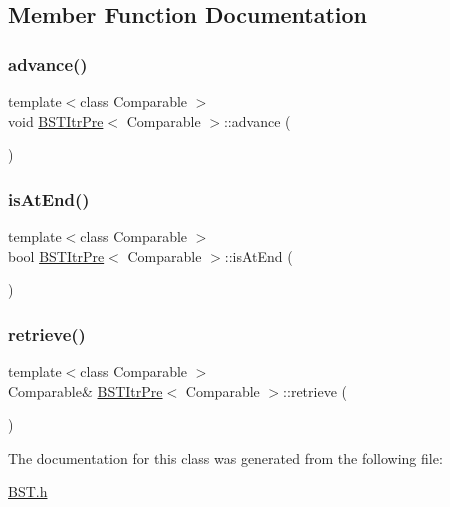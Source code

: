 \subsection{Member Function Documentation}
\mbox{\label{class_b_s_t_itr_pre_a7a743d66a842018fd833fb2b0737254d}} 
\subsubsection{\texorpdfstring{advance()}{advance()}}
{\footnotesize\ttfamily template$<$class Comparable $>$ \\
void \hyperlink{class_b_s_t_itr_pre}{B\+S\+T\+Itr\+Pre}$<$ Comparable $>$\+::advance (\begin{DoxyParamCaption}{ }\end{DoxyParamCaption})}

\mbox{\label{class_b_s_t_itr_pre_ae282a7b9ffa9d250bb0f6a6d79f6e8d0}} 
\subsubsection{\texorpdfstring{is\+At\+End()}{isAtEnd()}}
{\footnotesize\ttfamily template$<$class Comparable $>$ \\
bool \hyperlink{class_b_s_t_itr_pre}{B\+S\+T\+Itr\+Pre}$<$ Comparable $>$\+::is\+At\+End (\begin{DoxyParamCaption}{ }\end{DoxyParamCaption})\hspace{0.3cm}{\ttfamily [inline]}}

\mbox{\label{class_b_s_t_itr_pre_af40033e97f63bf025c2e33a9fdce4c43}} 
\subsubsection{\texorpdfstring{retrieve()}{retrieve()}}
{\footnotesize\ttfamily template$<$class Comparable $>$ \\
Comparable\& \hyperlink{class_b_s_t_itr_pre}{B\+S\+T\+Itr\+Pre}$<$ Comparable $>$\+::retrieve (\begin{DoxyParamCaption}{ }\end{DoxyParamCaption})\hspace{0.3cm}{\ttfamily [inline]}}



The documentation for this class was generated from the following file\+:\begin{DoxyCompactItemize}
\item 
\hyperlink{_b_s_t_8h}{B\+S\+T.\+h}\end{DoxyCompactItemize}
